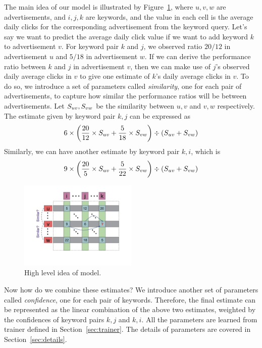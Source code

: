 The main idea of our model is illustrated by
Figure~\ref{fig:sppan-idea}, where $u,v,w$ are advertisements, and
$i,j,k$ are keywords, and the value in each cell is the average daily
clicks for the corresponding advertisement from the keyword query.
Let's say we want to predict the average daily click value if we want
to add keyword $k$ to advertisement $v$. For keyword pair $k$ and $j$,
we observed ratio $20/12$ in advertisement $u$ and $5/18$ in
advertisement $w$. If we can derive the performance ratio between $k$
and $j$ in advertisement $v$, then we can make use of $j$'s observed
daily average clicks in $v$ to give one estimate of $k$'s daily
average clicks in $v$. To do so, we introduce a set of parameters
called {\em similarity}, one for each pair of advertisements, to
capture how similar the performance ratios will be between
advertisements. Let $S_{{u}{v}},S_{{v}{w}}$ be the
similarity between $u,v$ and $v,w$ respectively. The estimate given by
keyword pair $k,j$ can be expressed as
\[ 6\times \left(\frac{20}{12}\times S_{{u}{v}} + \frac{5}{18}\times S_{{v}{w}} \right)\div \left(S_{{u}{v}} + S_{{v}{w}} \right) \]
Similarly, we can have another estimate by keyword pair $k,i$, which is
\[ 9\times \left(\frac{20}{5}\times S_{{u}{v}} + \frac{5}{22}\times S_{{v}{w}} \right)\div \left(S_{{u}{v}} + S_{{v}{w}} \right) \]

\begin{figure}[!ht]
  \centering
  \includegraphics[width=0.5\textwidth]{figures/example.jpg}
  \caption{High level idea of {\sppan} model.}
  \label{fig:sppan-idea}
\end{figure}

Now how do we combine these estimates? We introduce another set of
parameters called {\em confidence}, one for each pair of
keywords. Therefore, the final estimate can be represented as the
linear combination of the above two estimates, weighted by the
confidences of keyword pairs $k,j$ and $k,i$. All the parameters are
learned from {\sppan} trainer defined in Section~\ref{sec:trainer}.
The details of parameters are covered in Section~\ref{sec:details}.
